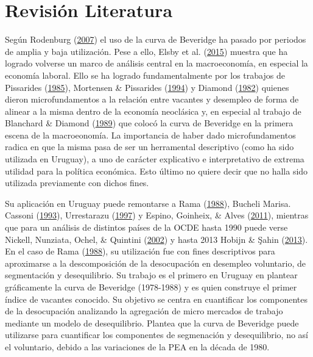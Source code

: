 \documentclass[12pt,twoside]{reedthesis}
\begin{document}
\hypertarget{fundamentos}{%
\chapter{Revisión Literatura}\label{fundamentos}}

Según Rodenburg (\protect\hyperlink{ref-Rodenburg2007}{2007}) el uso de la curva de Beveridge ha pasado por periodos de amplia y baja utilización. Pese a ello, Elsby et al. (\protect\hyperlink{ref-Elsby2015}{2015}) muestra que ha logrado volverse un marco de análisis central en la macroeconomía, en especial la economía laboral. Ello se ha logrado fundamentalmente por los trabajos de Pissarides (\protect\hyperlink{ref-Pissarides1985}{1985}), Mortensen \& Pissarides (\protect\hyperlink{ref-Mortensen1994}{1994}) y Diamond (\protect\hyperlink{ref-Diamond1982}{1982}) quienes dieron microfundamentos a la relación entre vacantes y desempleo de forma de alinear a la misma dentro de la economía neoclásica y, en especial al trabajo de Blanchard \& Diamond (\protect\hyperlink{ref-Blanchard1989}{1989}) que colocó la curva de Beveridge en la primera escena de la macroeonomía. La importancia de haber dado microfundamentos radica en que la misma pasa de ser un herramental descriptivo (como ha sido utilizada en Uruguay), a uno de carácter explicativo e interpretativo de extrema utilidad para la política económica. Esto último no quiere decir que no halla sido utilizada previamente con dichos fines.

Su aplicación en Uruguay puede remontarse a Rama (\protect\hyperlink{ref-Rama1988}{1988}), Bucheli Marisa. Cassoni (\protect\hyperlink{ref-DECON1993}{1993}), Urrestarazu (\protect\hyperlink{ref-Urrestarazu1997}{1997}) y Espino, Goinheix, \& Alves (\protect\hyperlink{ref-Alma2011}{2011}), mientras que para un análisis de distintos países de la OCDE hasta 1990 puede verse Nickell, Nunziata, Ochel, \& Quintini (\protect\hyperlink{ref-Nickell2002}{2002}) y hasta 2013 Hobijn \& Şahin (\protect\hyperlink{ref-Hobijn2013}{2013}). En el caso de Rama (\protect\hyperlink{ref-Rama1988}{1988}), su utilización fue con fines descriptivos para aproximarse a la descomposición de la desocupación en desempleo voluntario, de segmentación y desequilibrio. Su trabajo es el primero en Uruguay en plantear gráficamente la curva de Beveridge (1978-1988) y es quien construye el primer índice de vacantes conocido. Su objetivo se centra en cuantificar los componentes de la desocupación analizando la agregación de micro mercados de trabajo mediante un modelo de desequilibrio. Plantea que la curva de Beveridge puede utilizarse para cuantificar los componentes de segmenación y desequilibrio, no así el voluntario, debido a las variaciones de la PEA en la década de 1980.
\end{document}
